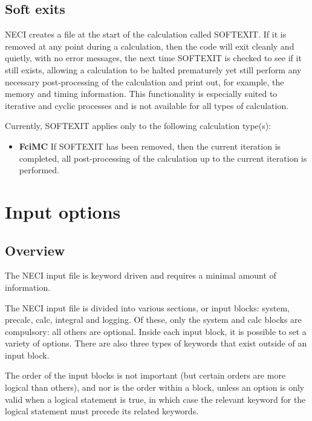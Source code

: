 \documentclass[openany,a4paper,10pt]{manual}
\begin{document}
\section{Soft exits}

NECI creates a file at the start of the calculation called SOFTEXIT.  If it is
removed at any point during a calculation, then the code will exit cleanly and
quietly, with no error messages, the next time SOFTEXIT is checked to see if it
still exists, allowing a calculation to be halted prematurely yet still perform
any necessary post-processing of the calculation and print out, for example,
the memory and timing information.  This functionality is especially suited to
iterative and cyclic processes and is not available for all types of
calculation.

Currently, SOFTEXIT applies only to the following calculation
type(s):
\begin{itemize}
\item {} 
\textbf{FciMC}
If SOFTEXIT has been removed, then the current
iteration is completed, all post-processing of the calculation up to the
current iteration is performed.

\end{itemize}

\resetcurrentobjects


\hypertarget{input-index}{}\chapter{Input options}

\resetcurrentobjects


\hypertarget{input-overview}{}\section{Overview}

The NECI input file is keyword driven and requires a minimal amount of information.

The NECI input file is divided into various sections, or input blocks: system, precalc, calc, integral and logging.  Of these, only the system and calc blocks are compulsory: all others are optional.  Inside each input block, it is possible to set a variety of options.  There are also three types of keywords that exist outside of an input block.

The order of the input blocks is not important (but certain orders are more logical than others), and nor is the order within a block, unless an option is only valid when a logical statement is true, in which case the relevant keyword for the logical statement must precede its related keywords.
\end{document}
